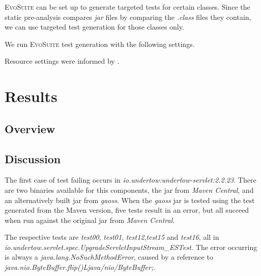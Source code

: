 \documentclass[conference]{IEEEtran}
\makeatletter
\newcommand{\evosuite}{\textsc{EvoSuite}\@\xspace}
\makeatother
\begin{document}
\evosuite can be set up to generate targeted tests for certain classes. Since the static pre-analysis compares \textit{jar} files by comparing the \textit{.class} files they contain, we can use targeted test generation for those classes only.   


We run \evosuite test generation with the following settings. 



Resource settings were informed by \cite{jahangirova2023sbft}. 



\section{Results}

\subsection{Overview}


\subsection{Discussion}

The first case of test failing occurs in \textit{io.undertow:undertow-servlet:2.2.23}. There are two binaries available for this components, the jar from \textit{Maven Central}, and an alternatively built jar from \textit{gaoss}. When the  \textit{gaoss} jar is tested using the test generated from the Maven version, five tests result in an error, but all succeed when run against the original jar from \textit{Maven Central}.

The respective tests are \textit{test00}, \textit{test01}, \textit{test12},\textit{test15} and \textit{test16}, all in \textit{io.under\-tow.\-servlet.\-spec.UpgradeServletInputStream\_ESTest.} The error occurring is always a \textit{java.lang.NoSuchMethodError}, caused by a reference to \textit{java.nio.ByteBuffer.flip()Ljava/nio/ByteBuffer;}.
\end{document}

